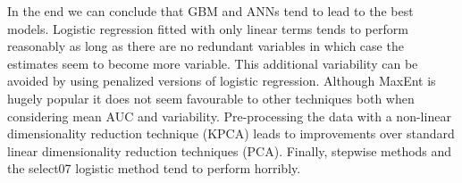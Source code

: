 In the end we can conclude that GBM and ANNs tend to lead to the best models. Logistic regression fitted with only linear terms tends to perform reasonably as long as there are no redundant variables in which case the estimates seem to become more variable. This additional variability can be avoided by using penalized versions of logistic regression. Although MaxEnt is hugely popular it does not seem favourable to other techniques both when considering mean AUC and variability. Pre-processing the data with a non-linear dimensionality reduction technique (KPCA) leads to improvements over standard linear dimensionality reduction techniques (PCA). Finally, stepwise methods and the select07 logistic method tend to perform horribly. 
